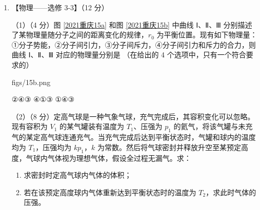 \documentclass[\gkver]{gaokaozhenti}
\begin{document}
\begin{enumerate}
{	

	所有可能的发射速度为：$\frac{L}{3t_{0}}$，$\frac{L}{2t_{0}}$，$\frac{(1+\sqrt{6})L}{5t_{0}}$。
}

\item
【物理——选修 3-3】（12 分）

（1）（4 分）图 \ref{2021重庆15a} 和图 \ref{2021重庆15b} 中曲线 Ⅰ、Ⅱ、Ⅲ 分别描述了某物理量随分子之间的距离变化的规律，$r_{0}$ 为平衡位置。现有如下物理量：①分子势能，②分子间引力，③分子间斥力，④分子间引力和斥力的合力，则曲线 Ⅰ、Ⅱ、Ⅲ 对应的物理量分别是 （在给出的 4 个选项中，只有一个符合要求的）

{figs/15b.png}

{②④③}
{④①③}
{①④③}

（2）（8 分）定高气球是一种气象气球，充气完成后，其容积变化可以忽略。现有容积为 $V_{1}$ 的某气罐装有温度为 $T_{1}$、压强为 $p_{1}$ 的氦气，将该气罐与未充气的某定高气球连通充气。当充气完成后达到平衡状态时，气罐和球内的温度均为 $T_{1}$，压强均为 $kp_{1}$，$k$ 为常数。然后将气球密封并释放升空至某预定高度，气球内气体视为理想气体，假设全过程无漏气。求：
\begin{enumerate}
	\item
	求密封时定高气球内气体的体积；
	\item
	若在该预定高度球内气体重新达到平衡状态时的温度为 $T_{2}$，求此时气体的压强。
\end{enumerate}

\end{enumerate}
\end{document}
